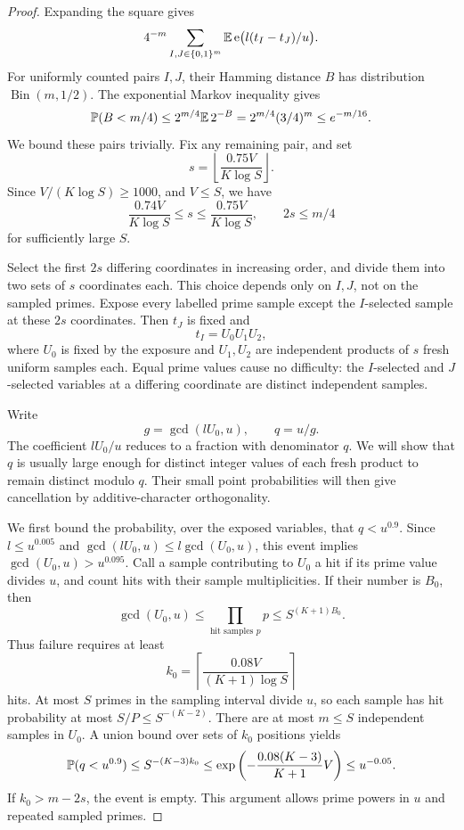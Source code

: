 \begin{proof}
Expanding the square gives
\[
 4^{-m}\sum_{I,J\in\{0,1\}^m}
       \mathbb E\,\mathrm e\bigl(l(t_I-t_J)/u\bigr).
\]
For uniformly counted pairs \(I,J\), their Hamming distance \(B\) has
distribution \(\operatorname{Bin}(m,1/2)\).  The exponential Markov
inequality gives
\[
 \mathbb P(B<m/4)
 \le 2^{m/4}\mathbb E\,2^{-B}
 =2^{m/4}(3/4)^m
 \le e^{-m/16}.
\]
We bound these pairs trivially.  Fix any remaining pair, and set
\[
 s=\left\lfloor\frac{0.75V}{K\log S}\right\rfloor.
\]
Since \(V/(K\log S)\ge1000\), and \(V\le S\), we have
\begin{equation}\label{eq:random-product-lengths}
 \frac{0.74V}{K\log S}\le s\le\frac{0.75V}{K\log S},
 \qquad 2s\le m/4
\end{equation}
for sufficiently large \(S\).

Select the first \(2s\) differing coordinates in increasing order, and
divide them into two sets of \(s\) coordinates each.  This choice depends
only on \(I,J\), not on the sampled primes.  Expose every labelled prime
sample except the \(I\)-selected sample at these \(2s\) coordinates.
Then \(t_J\) is fixed and
\[
 t_I=U_0U_1U_2,
\]
where \(U_0\) is fixed by the exposure and \(U_1,U_2\) are independent
products of \(s\) fresh uniform samples each.  Equal prime values cause
no difficulty: the \(I\)-selected and \(J\)-selected variables at a
differing coordinate are distinct independent samples.

Write
\[
 g=\gcd(lU_0,u),\qquad q=u/g.
\]
The coefficient \(lU_0/u\) reduces to a fraction with denominator
\(q\). We will show that \(q\) is usually large enough for distinct
integer values of each fresh product to remain distinct modulo \(q\).
Their small point probabilities will then give cancellation by
additive-character orthogonality.

We first bound the probability, over the exposed variables, that
\(q<u^{0.9}\).  Since \(l\le u^{0.005}\) and
\(\gcd(lU_0,u)\le l\gcd(U_0,u)\), this event implies
\(\gcd(U_0,u)>u^{0.095}\).
Call a sample contributing to \(U_0\) a hit if its prime value divides
\(u\), and count hits with their sample multiplicities.  If their number
is \(B_0\), then
\[
 \gcd(U_0,u)\le \prod_{\text{hit samples }p}p
       \le S^{(K+1)B_0}.
\]
Thus failure requires at least
\[
 k_0=\left\lceil\frac{0.08V}{(K+1)\log S}\right\rceil
\]
hits.  At most \(S\) primes in the sampling interval divide \(u\), so
each sample has hit probability at most
\(S/P\le S^{-(K-2)}\).  There are at most \(m\le S\) independent samples
in \(U_0\).  A union bound over sets of \(k_0\) positions yields
\begin{equation}\label{eq:random-gcd}
 \mathbb P(q<u^{0.9})
 \le S^{-(K-3)k_0}
 \le \exp\left(-\frac{0.08(K-3)}{K+1}V\right)
 \le u^{-0.05}.
\end{equation}
If \(k_0>m-2s\), the event is empty.  This argument allows prime powers
in \(u\) and repeated sampled primes.


\end{proof}
